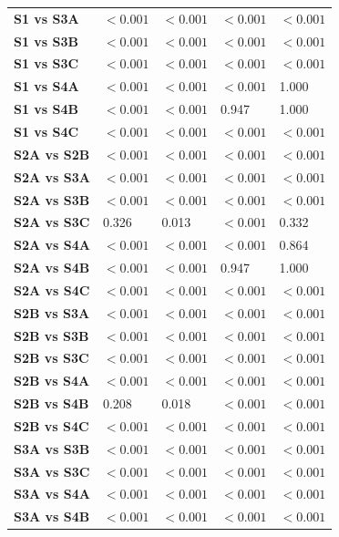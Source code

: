 \begin{table}[H]
{\begin{tabular}{lllll}
        \textbf{S1 vs S3A} & $< 0.001$ & $< 0.001$ & $< 0.001$ & $< 0.001$ \\
        \textbf{S1 vs S3B} & $< 0.001$ & $< 0.001$ & $< 0.001$ & $< 0.001$ \\
        \textbf{S1 vs S3C} & $< 0.001$ & $< 0.001$ & $< 0.001$ & $< 0.001$ \\
        \textbf{S1 vs S4A} & $< 0.001$ & $< 0.001$ & $< 0.001$ & 1.000 \\
        \textbf{S1 vs S4B} & $< 0.001$ & $< 0.001$ & 0.947 & 1.000 \\
        \textbf{S1 vs S4C} & $< 0.001$ & $< 0.001$ & $< 0.001$ & $< 0.001$ \\
        \textbf{S2A vs S2B} & $< 0.001$ & $< 0.001$ & $< 0.001$ & $< 0.001$ \\
        \textbf{S2A vs S3A} & $< 0.001$ & $< 0.001$ & $< 0.001$ & $< 0.001$ \\
        \textbf{S2A vs S3B} & $< 0.001$ & $< 0.001$ & $< 0.001$ & $< 0.001$ \\
        \textbf{S2A vs S3C} & 0.326 & 0.013 & $< 0.001$ & 0.332 \\
        \textbf{S2A vs S4A} & $< 0.001$ & $< 0.001$ & $< 0.001$ & 0.864 \\
        \textbf{S2A vs S4B} & $< 0.001$ & $< 0.001$ & 0.947 & 1.000 \\
        \textbf{S2A vs S4C} & $< 0.001$ & $< 0.001$ & $< 0.001$ & $< 0.001$ \\
        \textbf{S2B vs S3A} & $< 0.001$ & $< 0.001$ & $< 0.001$ & $< 0.001$ \\
        \textbf{S2B vs S3B} & $< 0.001$ & $< 0.001$ & $< 0.001$ & $< 0.001$ \\
        \textbf{S2B vs S3C} & $< 0.001$ & $< 0.001$ & $< 0.001$ & $< 0.001$ \\
        \textbf{S2B vs S4A} & $< 0.001$ & $< 0.001$ & $< 0.001$ & $< 0.001$ \\
        \textbf{S2B vs S4B} & 0.208 & 0.018 & $< 0.001$ & $< 0.001$ \\
        \textbf{S2B vs S4C} & $< 0.001$ & $< 0.001$ & $< 0.001$ & $< 0.001$ \\
        \textbf{S3A vs S3B} & $< 0.001$ & $< 0.001$ & $< 0.001$ & $< 0.001$ \\
        \textbf{S3A vs S3C} & $< 0.001$ & $< 0.001$ & $< 0.001$ & $< 0.001$ \\
        \textbf{S3A vs S4A} & $< 0.001$ & $< 0.001$ & $< 0.001$ & $< 0.001$ \\
        \textbf{S3A vs S4B} & $< 0.001$ & $< 0.001$ & $< 0.001$ & $< 0.001$ \\

\end{tabular}}
\end{table}
